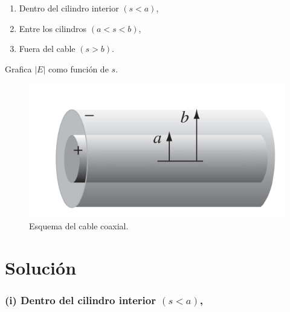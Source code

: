 \documentclass[12pt]{article}
\begin{document}
\begin{enumerate}[label=(\roman*)]
    \item Dentro del cilindro interior \((s < a)\),
    \item Entre los cilindros \((a < s < b)\),
    \item Fuera del cable \((s > b)\).
\end{enumerate}
Grafica \( |E| \) como función de \( s \).

\begin{figure}[ht]
    \centering
    \includegraphics[width=0.5\linewidth]{imagenes/5_IMG.png}
    \caption{Esquema del cable coaxial.}
    \label{fig:figura226}
\end{figure}

\section*{Solución}

\subsubsection*{(i) Dentro del cilindro interior \((s < a)\),}
\end{document}
